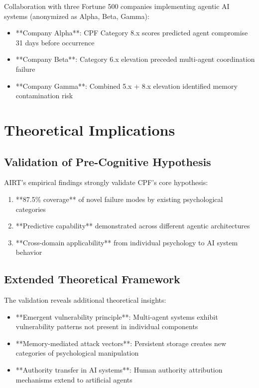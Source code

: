 \documentclass[11pt,a4paper]{article}
\begin{document}
Collaboration with three Fortune 500 companies implementing agentic AI systems (anonymized as Alpha, Beta, Gamma):
\begin{itemize}
\item **Company Alpha**: CPF Category 8.x scores predicted agent compromise 31 days before occurrence
\item **Company Beta**: Category 6.x elevation preceded multi-agent coordination failure
\item **Company Gamma**: Combined 5.x + 8.x elevation identified memory contamination risk
\end{itemize}

\section{Theoretical Implications}

\subsection{Validation of Pre-Cognitive Hypothesis}

AIRT's empirical findings strongly validate CPF's core hypothesis:
\begin{enumerate}
\item **87.5\% coverage** of novel failure modes by existing psychological categories
\item **Predictive capability** demonstrated across different agentic architectures
\item **Cross-domain applicability** from individual psychology to AI system behavior
\end{enumerate}

\subsection{Extended Theoretical Framework}

The validation reveals additional theoretical insights:
\begin{itemize}
\item **Emergent vulnerability principle**: Multi-agent systems exhibit vulnerability patterns not present in individual components
\item **Memory-mediated attack vectors**: Persistent storage creates new categories of psychological manipulation
\item **Authority transfer in AI systems**: Human authority attribution mechanisms extend to artificial agents
\end{itemize}
\end{document}
